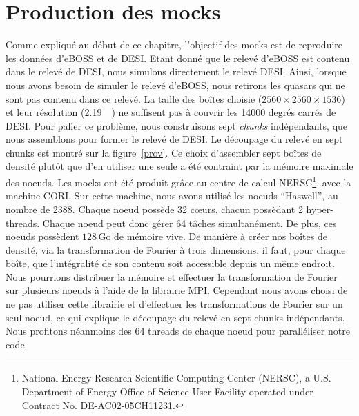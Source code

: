 \documentclass[11pt, twoside, a4paper, openright]{report}
\begin{document}
\section{Production des mocks}
Comme expliqué au début de ce chapitre, l'objectif des mocks est de reproduire les données d'eBOSS et de DESI. Etant donné que le relevé d'eBOSS est contenu dans le relevé de DESI, nous simulons directement le relevé DESI. Ainsi, lorsque nous avons besoin de simuler le relevé d'eBOSS, nous retirons les quasars qui ne sont pas contenu dans ce relevé. La taille des boîtes choisie ($\num{2560}\times\num{2560}\times\num{1536}$) et leur résolution (\SI{2.19}{\perh\Mpc}) ne suffisent pas à couvrir les \num{14000} degrés carrés de DESI. Pour palier ce problème, nous construisons sept \emph{chunks} indépendants, que nous assemblons pour former le relevé de DESI. Le découpage du relevé en sept chunks est montré sur la figure~\ref{prov}. Ce choix d'assembler sept boîtes de densité plutôt que d'en utiliser une seule a été contraint par la mémoire maximale des noeuds. Les mocks ont été produit grâce au centre de calcul NERSC\footnote{National Energy Research Scientific Computing Center (NERSC), a U.S. Department of Energy Office of Science User Facility operated under Contract No. DE-AC02-05CH11231.}, avec la machine CORI. Sur cette machine, nous avons utilisé les noeuds ``Haswell'', au nombre de \num{2388}. Chaque noeud possède 32 c{\oe}urs, chacun possèdant 2 hyper-threads. Chaque noeud peut donc gérer 64 tâches simultanément. De plus, ces noeuds possèdent $\num{128}\,\mathrm{Go}$ de mémoire vive. De manière à créer nos boîtes de densité, via la transformation de Fourier à trois dimensions, il faut, pour chaque boîte, que l'intégralité de son contenu soit accessible depuis un même endroit. Nous pourrions distribuer la mémoire et effectuer la transformation de Fourier sur plusieurs noeuds à l'aide de la librairie MPI. Cependant nous avons choisi de ne pas utiliser cette librairie et d'effectuer les transformations de Fourier sur un seul noeud, ce qui explique le découpage du relevé en sept chunks indépendants. Nous profitons néanmoins des 64 threads de chaque noeud pour paralléliser notre code.
\end{document}
